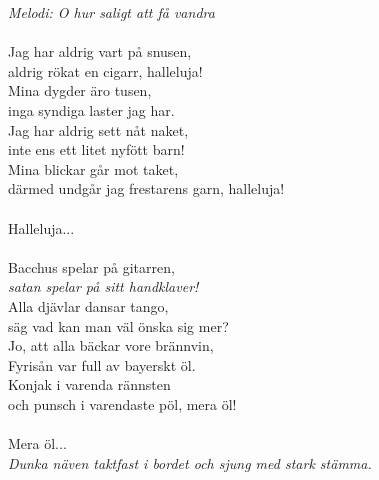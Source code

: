 {\footnotesize\textit{Melodi: O hur saligt att få vandra}}\\
\\
Jag har aldrig vart på snusen,\\
aldrig rökat en cigarr, halleluja!\\
Mina dygder äro tusen,\\
inga syndiga laster jag har.\\
Jag har aldrig sett nåt naket,\\
inte ens ett litet nyfött barn!\\
Mina blickar går mot taket,\\
därmed undgår jag frestarens garn, halleluja!\\
\\
Halleluja...\\
\\
Bacchus spelar på gitarren,\\
\textit{satan spelar på sitt handklaver!}\\
Alla djävlar dansar tango,\\
säg vad kan man väl önska sig mer?\\
Jo, att alla bäckar vore brännvin,\\
Fyrisån var full av bayerskt öl.\\
Konjak i varenda rännsten\\
och punsch i varendaste pöl, mera öl!\\
\\
Mera öl...\\

{\footnotesize\textit{Dunka näven taktfast i bordet och sjung med stark stämma.}}
